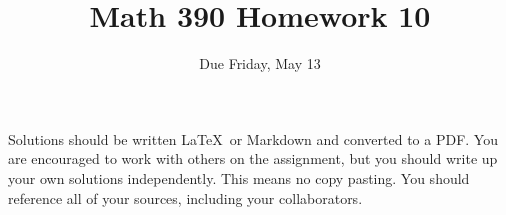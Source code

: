 \documentclass{article}
\title{Math 390 Homework 10}
\author{Due Friday, May 13}
\date{}
\begin{document}

\maketitle

\setlength{\parindent}{0em} %
\setlength{\parskip}{1em} %



Solutions should be written \LaTeX\ or Markdown and converted to a PDF. You are encouraged to work with others
on the assignment, but you should write up your own solutions independently. This means no copy pasting. You should
reference all of your sources, including your collaborators. 
\end{document}

